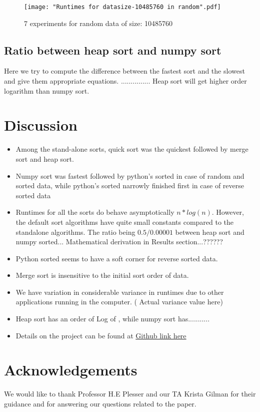 \documentclass[sigconf,  natbib, screen]{acmart}
\begin{document}
\begin{figure}[ht]
\texttt{[image: "Runtimes for datasize-10485760 in random".pdf]}
    \caption{7 experiments for random data of size: 10485760 }
    \label{fig:scatterrandom}
\end{figure}

\subsection{Ratio between heap sort and numpy sort}\label{math}
Here we try to compute the difference between the fastest sort and the slowest and give them appropriate equations. ............... Heap sort will get higher order logarithm than numpy sort.

\section{Discussion}\label{sec:discussion}

\begin{itemize}
\item Among the stand-alone sorts, quick sort was the quickest followed by merge sort and heap sort.
\item Numpy sort was fastest followed by python's sorted in case of random and sorted data, while python's sorted narrowly finished first in case of reverse sorted data
\item Runtimes for all the sorts do behave asymptotically $n*log(n)$. However, the default sort algorithms have quite small constants compared to the standalone algorithms. The ratio being $0.5/0.00001$ between heap sort and numpy sorted... Mathematical derivation in Results section...?????? 
\item Python sorted seems to have a soft corner for reverse sorted data.
\item Merge sort is insensitive to the initial sort order of data.
\item We have variation in considerable variance in runtimes due to other applications running in the computer. ( Actual variance value here) 
\item Heap sort has an order of Log of , while numpy sort has...........
\item Details on the project can be found at \href{https://github.com/vsnupoudel/termpaper01}{Github link here}
\end{itemize}



\section{Acknowledgements}\label{sec:acknowledgements}
We would like to thank Professor H.E Plesser and our TA Krista Gilman for their guidance and for answering our questions related to the paper.



\end{document}
